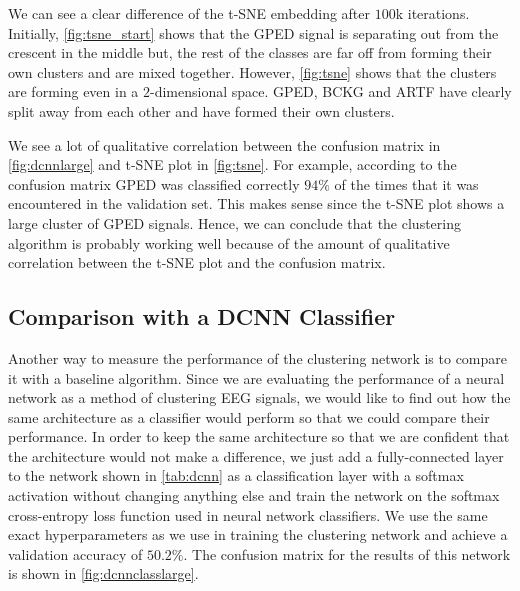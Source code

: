 We can see a clear difference of the t-SNE embedding after $100$k iterations. Initially, \cref{fig:tsne_start} shows that the GPED signal is separating out from the crescent in the middle but, the rest of the classes are far off from forming their own clusters and are mixed together. However, \cref{fig:tsne} shows that the clusters are forming even in a $2$-dimensional space.  GPED, BCKG and ARTF have clearly split away from each other and have formed their own clusters. 

We see a lot of qualitative correlation between the confusion matrix in \cref{fig:dcnnlarge} and t-SNE plot in \cref{fig:tsne}. For example, according to the confusion matrix GPED was classified correctly $94\%$ of the times that it was encountered in the validation set. This makes sense since the t-SNE plot shows a large cluster of GPED signals. Hence, we can conclude that the clustering algorithm is probably working well because of the amount of qualitative correlation between the t-SNE plot and the confusion matrix.


\subsection{Comparison with a DCNN Classifier}
Another way to measure the performance of the clustering network is to compare it with a baseline algorithm. Since we are evaluating the performance of a neural network as a method of clustering EEG signals, we would like to find out how the same architecture as a classifier would perform so that we could compare their performance. In order to keep the same architecture so that we are confident that the architecture would not make a difference, we just add a fully-connected layer to the network shown in \cref{tab:dcnn} as a classification layer with a softmax activation without changing anything else and train the network on the softmax cross-entropy loss function used in neural network classifiers. We use the same exact hyperparameters as we use in training the clustering network and achieve a validation accuracy of $50.2\%$. The confusion matrix for the results of this network is shown in \cref{fig:dcnnclasslarge}. 

